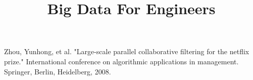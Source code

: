 \documentclass[11pt]{article}
\title{Big Data For Engineers}
\author{}
\date{}
\begin{document}
    \maketitle
    
    
    


    \begin{thebibliography}{9}
         Zhou, Yunhong, et al. "Large-scale parallel collaborative filtering for the netflix prize."
        International conference on algorithmic applications in management. Springer, Berlin, Heidelberg, 2008.

    \end{thebibliography}
\end{document}
